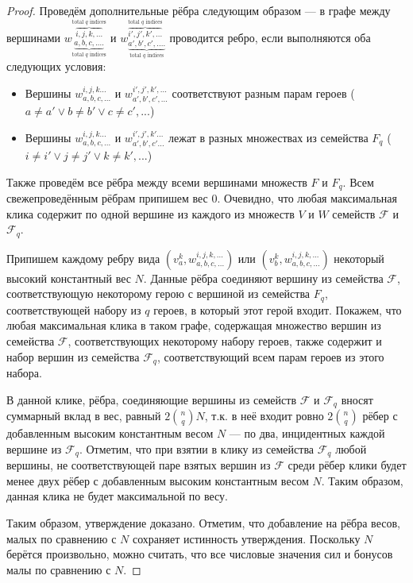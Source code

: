 \documentclass{article}
\begin{document}
\begin{proof}
    Проведём дополнительные рёбра следующим образом --- в графе между вершинами $w_{\underbrace{a, b, c, ....}_\text{total $q$ indices}}^{\overbrace{i,j,k,...}^\text{total $q$ indices}}$ и $w_{\underbrace{a', b', c', ....}_\text{total $q$ indices}}^{\overbrace{i',j',k',...}^\text{total $q$ indices}}$ проводится ребро, если выполняются оба следующих условия:
    \begin{itemize}
        \item Вершины $w_{a,b,c,...}^{i,j,k...}$ и $w_{a',b',c',...}^{i', j',k',...}$ соответствуют разным парам героев ($a \neq a' \lor b \neq b' \lor c \neq c',...$)
        \item Вершины $w_{a,b,c,...}^{i,j,k...}$ и $w_{a',b',c'...}^{i', j',k'...}$ лежат в разных множествах из семейства $F_q$ ($i \neq i' \lor j \neq j' \lor k \neq k',... $)
    \end{itemize}
    
    Также проведём все рёбра между всеми вершинами множеств $F$ и $F_q$. Всем свежепроведённым рёбрам припишем вес 0. Очевидно, что любая максимальная клика содержит по одной вершине из каждого из множеств $V$ и $W$ семейств $\mathcal{F}$ и $\mathcal{F}_q$. 
    
    Припишем каждому ребру вида $(v_a^k, w_{a,b,c,...}^{i,j,k,...})$ или $(v_b^k, w_{a,b,c,...}^{i, j,k,...})$ некоторый высокий константный вес $N$. Данные рёбра соединяют вершину из семейства $\mathcal{F}$, соответствующую некоторому герою с вершиной из семейства $F_q$, соответствующей набору из $q$ героев, в который этот герой входит. Покажем, что любая максимальная клика в таком графе, содержащая множество вершин из семейства $\mathcal{F}$, соответствующих некоторому набору героев, также содержит и набор вершин из семейства $\mathcal{F}_q$, соответствующий всем парам героев из этого набора.
    
    В данной клике, рёбра, соединяющие вершины из семейств $\mathcal{F}$ и $\mathcal{F}_q$ вносят суммарный вклад в вес, равный $2 \binom{n}{q} N$, т.к. в неё входит ровно $2 \binom{n}{q}$ рёбер с добавленным высоким константным весом $N$ --- по два, инцидентных каждой вершине из $\mathcal{F}_q$. Отметим, что при взятии в клику из семейства $\mathcal{F}_q$ любой вершины, не соответствующей паре взятых вершин из $\mathcal{F}$ среди рёбер клики будет менее двух рёбер с добавленным высоким константным весом $N$. Таким образом, данная клика не будет максимальной по весу.
    
Таким образом, утверждение доказано. Отметим, что добавление на рёбра весов, малых по сравнению с $N$ сохраняет истинность утверждения. Поскольку $N$ берётся произвольно, можно считать, что все числовые значения сил и бонусов малы по сравнению с $N$.


\end{proof}
\end{document}
